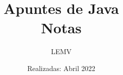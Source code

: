 \documentclass{article}
\title{Apuntes de Java\\
\Large{Notas}}
\author{LEMV}
\date{Realizadas: Abril 2022}
\begin{document}
\renewcommand*\contentsname{Índice}
\renewcommand{\listtablename}{Índice de Tablas}

\maketitle\newpage
\tableofcontents\newpage







\end{document}
